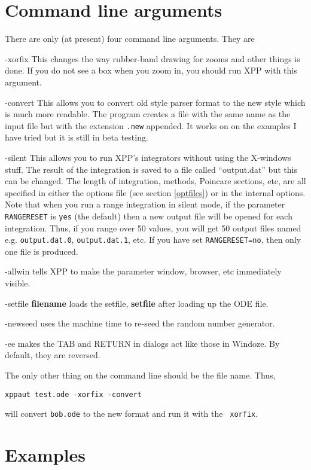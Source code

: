 \documentclass{article}
\begin{document}
\section{Command line arguments}
There are only (at present) four command line arguments.
They are 
\begin{description}
\item{-xorfix} This changes the way rubber-band drawing for zooms and
other things is done. If you do not see a box when you zoom in, you
should run XPP with this argument.
\item{-convert}  This allows you to convert old style parser format to
the new style which is much more readable. The program creates a file
with the same name as the input file but with the extension {\tt .new}
appended. It works on on the examples I have tried but it is still in
beta testing.
\item{-silent} This allows you to run XPP's integrators without using
the X-windows stuff.  The result of the integration is saved to a file
called ``output.dat'' but this can be changed. The length of
integration, methods, Poincare sections, etc, are all specified in
either the options file (see section \ref{optfiles})
 or in the internal options. Note that when you run a range integration
in silent mode, if the parameter {\tt RANGERESET} is {\tt yes} (the default) 
then a new output file will be opened for each integration. Thus, if you range 
over 50 values, you will get 50 output files named e.g. {\tt output.dat.0}, 
{\tt output.dat.1}, etc. If you have set {\tt RANGERESET=no}, then only
one file is produced.
\item{-allwin} tells XPP to make the parameter window, browser, etc
immediately visible.
\item{-setfile {\bf filename}} loads the setfile, {\bf setfile} after
loading up the  ODE file.
\item{-newseed} uses the machine time to re-seed the random number
generator. 
\item{-ee} makes the TAB and RETURN in dialogs act like those in
Windoze. By default, they are reversed.   
\end{description}
The only other thing on the command line should be the file name.  
Thus, 
\begin{verbatim}
xppaut test.ode -xorfix -convert
\end{verbatim}
will convert {\tt bob.ode} to the new format and run it with the {\tt
xorfix}.

\section{ Examples}
\end{document}
